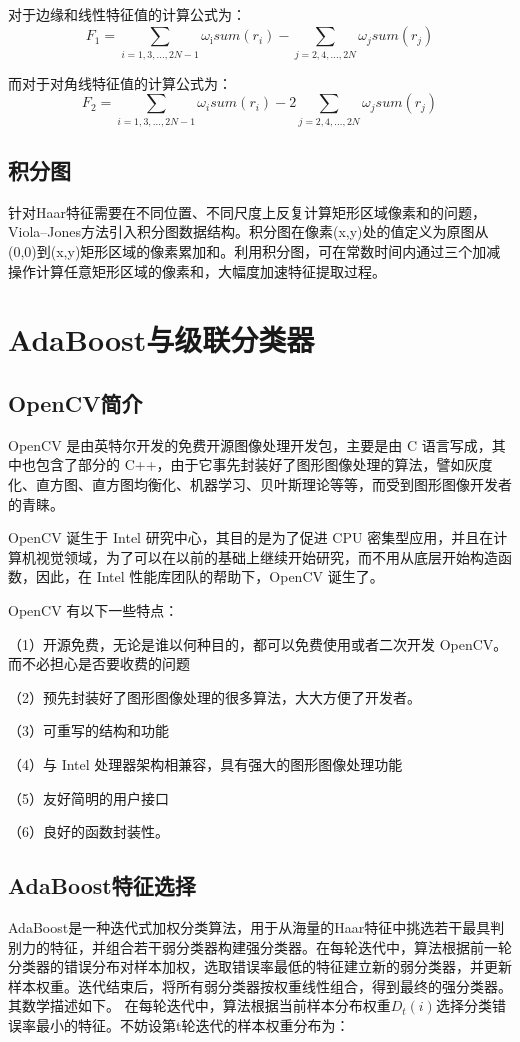 \documentclass[UTF8]{ctexart}
\begin{document}
对于边缘和线性特征值的计算公式为\cite{wang2014}：\[{{F}_{1}}=\sum\limits_{i=1,3,...,2N-1}^{{}}{{{\omega }_{\text{i}}}sum({{r}_{i}})}-\sum\limits_{j=2,4,...,2N}{{{\omega }_{j}}sum({{r}_{j}})}\]

而对于对角线特征值的计算公式为\cite{wang2014}：\[{{F}_{2}}=\sum\limits_{i=1,3,...,2N-1}{{{\omega }_{i}}sum({{r}_{i}})}-2\sum\limits_{j=2,4,...,2N}{{{\omega }_{j}}sum({{r}_{j}})}\]

\subsection{积分图}
针对Haar特征需要在不同位置、不同尺度上反复计算矩形区域像素和的问题，Viola–Jones方法引入积分图数据结构。积分图在像素(x,y)处的值定义为原图从(0,0)到(x,y)矩形区域的像素累加和。利用积分图，可在常数时间内通过三个加减操作计算任意矩形区域的像素和，大幅度加速特征提取过程。

\section{AdaBoost与级联分类器}
\subsection{OpenCV简介}
OpenCV 是由英特尔开发的免费开源图像处理开发包，主要是由 C 语言写成，其中也包含了部分的 C++，由于它事先封装好了图形图像处理的算法，譬如灰度化、直方图、直方图均衡化、机器学习、贝叶斯理论等等，而受到图形图像开发者的青睐。

OpenCV 诞生于 Intel 研究中心，其目的是为了促进 CPU 密集型应用，并且在计算机视觉领域，为了可以在以前的基础上继续开始研究，而不用从底层开始构造函数，因此，在 Intel 性能库团队的帮助下，OpenCV 诞生了。

OpenCV 有以下一些特点\cite{hou2012}：

（1）开源免费，无论是谁以何种目的，都可以免费使用或者二次开发 OpenCV。而不必担心是否要收费的问题

（2）预先封装好了图形图像处理的很多算法，大大方便了开发者。

（3）可重写的结构和功能

（4）与 Intel 处理器架构相兼容，具有强大的图形图像处理功能

（5）友好简明的用户接口

（6）良好的函数封装性。

\subsection{AdaBoost特征选择}
AdaBoost是一种迭代式加权分类算法，用于从海量的Haar特征中挑选若干最具判别力的特征，并组合若干弱分类器构建强分类器。在每轮迭代中，算法根据前一轮分类器的错误分布对样本加权，选取错误率最低的特征建立新的弱分类器，并更新样本权重。迭代结束后，将所有弱分类器按权重线性组合，得到最终的强分类器。其数学描述如下。
在每轮迭代中，算法根据当前样本分布权重$D_t(i)$选择分类错误率最小的特征。不妨设第t轮迭代的样本权重分布为：
\end{document}
